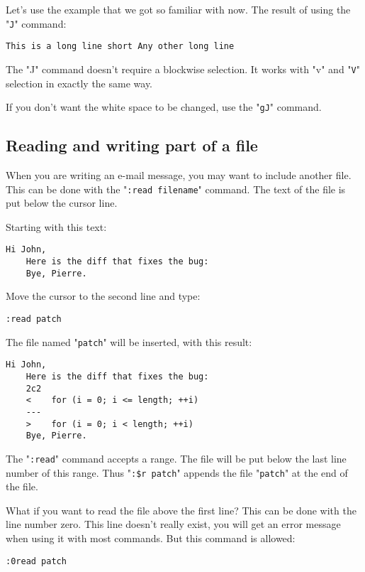 {Let's use the example that we got so familiar with now.
The result of using the "\texttt{J}" command:

\begin{Verbatim}[samepage=true]
    This is a long line short Any other long line 
\end{Verbatim}

The "J" command doesn't require a blockwise selection.
It works with "v" and "\texttt{V}" selection in exactly the same way.

If you don't want the white space to be changed, use the "\texttt{gJ}" command.
\subsection{Reading and writing part of a file}
When you are writing an e-mail message, you may want to include another file.
This can be done with the "\texttt{:read {filename}}" command.
The text of the file is put below the cursor line.

Starting with this text:

\begin{Verbatim}[samepage=true]
    Hi John, 
    Here is the diff that fixes the bug: 
    Bye, Pierre. 
\end{Verbatim}

Move the cursor to the second line and type:

\begin{Verbatim}[samepage=true]
 :read patch
\end{Verbatim}

The file named "\texttt{patch}" will be inserted, with this result:

\begin{Verbatim}[samepage=true]
    Hi John, 
    Here is the diff that fixes the bug: 
    2c2 
    <    for (i = 0; i <= length; ++i) 
    --- 
    >    for (i = 0; i < length; ++i) 
    Bye, Pierre. 
\end{Verbatim}

The "\texttt{:read}" command accepts a range.
The file will be put below the last line number of this range.
Thus "\texttt{:\$r patch}" appends the file "\texttt{patch}" at the end of the file.

What if you want to read the file above the first line?  This can be done with the line number zero.
This line doesn't really exist, you will get an error message when using it with most commands.
But this command is allowed:

\begin{Verbatim}[samepage=true]
 :0read patch
\end{Verbatim}

}
